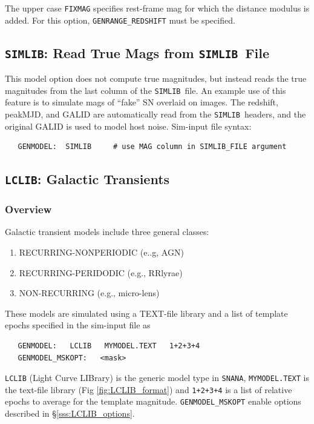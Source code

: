 \documentclass[12pt]{article}
\newcommand{\LCLIB}{{\tt LCLIB}}
\newcommand{\snana}{{\tt SNANA}}
\newcommand{\simlib}{{\tt SIMLIB}}
\begin{document}
The upper case {\tt FIXMAG} specifies rest-frame mag for which
the distance modulus is added. 
For this option, \verb|GENRANGE_REDSHIFT| must be specified.


\subsection{{\simlib}: Read True Mags from \simlib\ File}
\label{subsec:MODEL_SIMLIB}

This model option does not compute true magnitudes, but instead
reads the true magnitudes from the last column of the \simlib\ file.
An example use of this feature is to simulate mags of
``fake'' SN overlaid on images. The redshift, peakMJD, and GALID
are automatically read from the \simlib\ headers, and the
original GALID is used to model host noise.
Sim-input file syntax:
\begin{verbatim}
   GENMODEL:  SIMLIB     # use MAG column in SIMLIB_FILE argument
\end{verbatim}


\subsection{{\LCLIB}: Galactic Transients}
\label{subsec:MODEL_LCLIB}

\subsubsection{Overview}
\label{sss:LCLIB_overview}

\noindent Galactic transient models include three general classes:
\begin{enumerate}
  \item RECURRING-NONPERIODIC (e..g, AGN)
  \item RECURRING-PERIDODIC  (e.g., RRlyrae)
  \item NON-RECURRING  (e.g., micro-lens)
\end{enumerate}
%
\noindent
These models are simulated using a TEXT-file library and a list of 
template epochs specified in the sim-input file as
%
\begin{verbatim}
   GENMODEL:   LCLIB   MYMODEL.TEXT   1+2+3+4
   GENMODEL_MSKOPT:   <mask>
\end{verbatim}
{\tt LCLIB} (Light Curve LIBrary) is the generic model type in \snana,
{\tt MYMODEL.TEXT} is the text-file library (Fig \ref{fig:LCLIB_format})
and {\tt 1+2+3+4} is a list of relative epochs to average for the template magnitude.
{\tt GENMODEL\_MSKOPT} enable options described in \S\ref{sss:LCLIB_options}.
\end{document}
